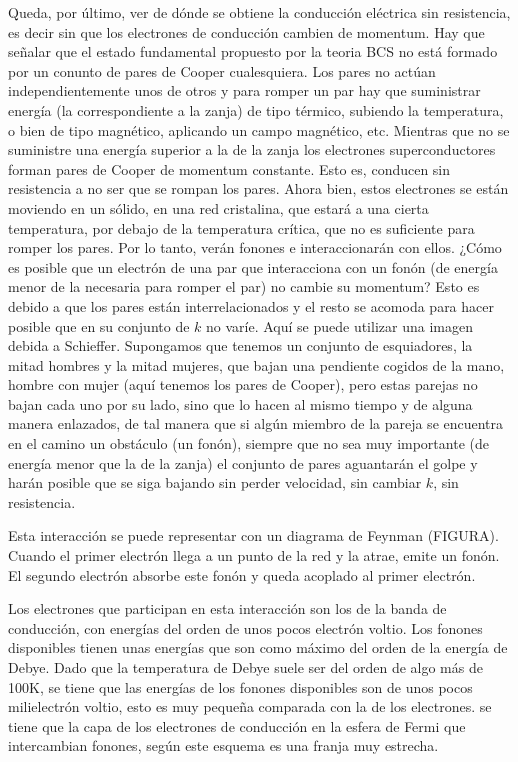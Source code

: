 Queda, por último, ver de dónde se obtiene la conducción eléctrica sin resistencia, es decir sin que los electrones de conducción cambien de momentum. Hay que señalar que el estado fundamental propuesto por la teoria BCS no está formado por un conunto de pares de Cooper cualesquiera. Los pares no actúan independientemente unos de otros y para romper un par hay que suministrar energía (la correspondiente a la zanja) de tipo térmico, subiendo la temperatura, o bien de tipo magnético, aplicando un campo magnético, etc. Mientras que no se suministre una energía superior a la de la zanja los electrones superconductores forman pares de Cooper de momentum constante. Esto es, conducen sin resistencia a no ser que se rompan los pares. Ahora bien, estos electrones se están moviendo en un sólido, en una red cristalina, que estará a una cierta temperatura, por debajo de la temperatura crítica, que no es suficiente para romper los pares. Por lo tanto, verán fonones e interaccionarán con ellos. ¿Cómo es posible que un electrón de una par que interacciona con un fonón (de energía menor de la necesaria para romper el par) no cambie su momentum? Esto es debido a que los pares están interrelacionados y el resto se acomoda para hacer posible que en su conjunto de $k$ no varíe. Aquí se puede utilizar una imagen debida a Schieffer. Supongamos que tenemos un conjunto de esquiadores, la mitad hombres y la mitad mujeres, que bajan una pendiente cogidos de la mano, hombre con mujer (aquí tenemos los pares de Cooper), pero estas parejas no bajan cada uno por su lado, sino que lo hacen al mismo tiempo y de alguna manera enlazados, de tal manera que si algún miembro de la pareja se encuentra en el camino un obstáculo (un fonón), siempre que no sea muy importante (de energía menor que la de la zanja) el conjunto de pares aguantarán el golpe y harán posible que se siga bajando sin perder velocidad, sin cambiar $k$, sin resistencia.

Esta interacción se puede representar con un diagrama de Feynman (FIGURA). Cuando el primer electrón llega a un punto de la red y la atrae, emite un fonón. El segundo electrón absorbe este fonón y queda acoplado al primer electrón.

Los electrones que participan en esta interacción son los de la banda de conducción, con energías del orden de unos pocos electrón voltio. Los fonones disponibles tienen unas energías que son como máximo del orden de \color{red}la energía de Debye\color{black}. Dado que la temperatura de Debye suele ser del orden de algo más de 100K, se tiene que las energías de los fonones disponibles son de unos pocos milielectrón voltio, esto es muy pequeña comparada con la de los electrones. se tiene que la capa de los electrones de conducción en la esfera de Fermi que intercambian fonones, según este esquema es una franja muy estrecha.

